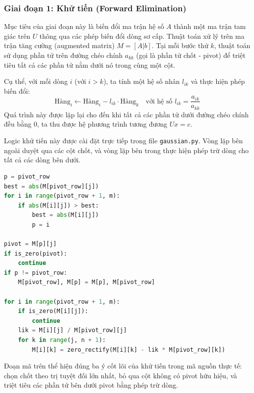 \subsubsection{Giai đoạn 1: Khử tiến (Forward Elimination)}
Mục tiêu của giai đoạn này là biến đổi ma trận hệ số $A$ thành một ma trận tam giác trên $U$ thông qua các phép biến đổi dòng sơ cấp. Thuật toán xử lý trên ma trận tăng cường (augmented matrix) $M = [A|b]$. Tại mỗi bước thứ $k$, thuật toán sử dụng phần tử trên đường chéo chính $a_{kk}$ (gọi là phần tử chốt - pivot) để triệt tiêu tất cả các phần tử nằm dưới nó trong cùng một cột.

Cụ thể, với mỗi dòng $i$ (với $i > k$), ta tính một hệ số nhân $l_{ik}$ và thực hiện phép biến đổi:
\begin{equation}
    \text{Hàng}_i \leftarrow \text{Hàng}_i - l_{ik} \cdot \text{Hàng}_k \quad \text{với hệ số } l_{ik} = \frac{a_{ik}}{a_{kk}}
\end{equation}
Quá trình này được lặp lại cho đến khi tất cả các phần tử dưới đường chéo chính đều bằng 0, ta thu được hệ phương trình tương đương $Ux=c$.

Logic khử tiến này được cài đặt trực tiếp trong file \texttt{gaussian.py}. Vòng lặp bên ngoài duyệt qua các cột chốt, và vòng lặp bên trong thực hiện phép trừ dòng cho tất cả các dòng bên dưới.

\begin{lstlisting}[language=Python, caption={Trích đoạn logic khử tiến từ \texttt{gaussian.py}}]
p = pivot_row
best = abs(M[pivot_row][j])
for i in range(pivot_row + 1, m):
    if abs(M[i][j]) > best:
        best = abs(M[i][j])
        p = i

pivot = M[p][j]
if is_zero(pivot):
    continue
if p != pivot_row:
    M[pivot_row], M[p] = M[p], M[pivot_row]

for i in range(pivot_row + 1, m):
    if is_zero(M[i][j]):
        continue
    lik = M[i][j] / M[pivot_row][j]
    for k in range(j, n + 1):
        M[i][k] = zero_rectify(M[i][k] - lik * M[pivot_row][k])
\end{lstlisting}
Đoạn mã trên thể hiện đúng ba ý cốt lõi của khử tiến trong mã nguồn thực tế: chọn chốt theo trị tuyệt đối lớn nhất, bỏ qua cột không có pivot hữu hiệu, và triệt tiêu các phần tử bên dưới pivot bằng phép trừ dòng.

